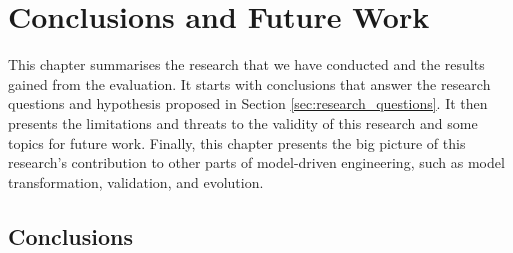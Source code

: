 \chapter{Conclusions and Future Work}
\label{ch:conclusions_and_future_work}

This chapter summarises the research that we have conducted and the results gained from the evaluation. It starts with conclusions that answer the research questions and hypothesis proposed in Section \ref{sec:research_questions}. It then presents the limitations and threats to the validity of this research and some topics for future work. Finally, this chapter presents the big picture of this research’s contribution to other parts of model-driven engineering, such as model transformation, validation, and evolution.

\section{Conclusions}
\label{conclusions_overall}
